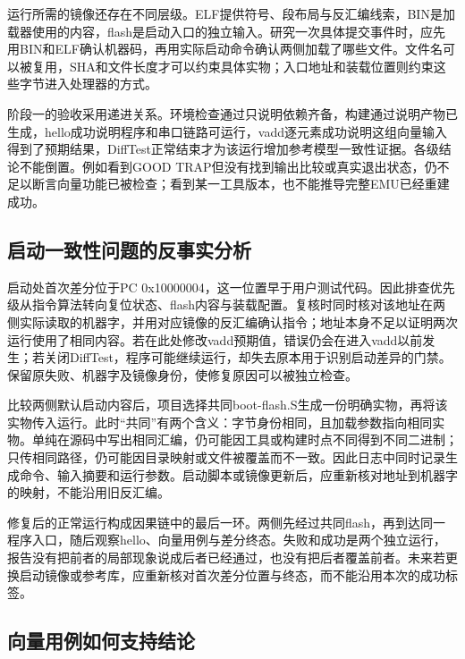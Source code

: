 运行所需的镜像还存在不同层级。ELF提供符号、段布局与反汇编线索，BIN是加载器使用的内容，flash是启动入口的独立输入。研究一次具体提交事件时，应先用BIN和ELF确认机器码，再用实际启动命令确认两侧加载了哪些文件。文件名可以被复用，SHA和文件长度才可以约束具体实物；入口地址和装载位置则约束这些字节进入处理器的方式。\par


阶段一的验收采用递进关系。环境检查通过只说明依赖齐备，构建通过说明产物已生成，hello成功说明程序和串口链路可运行，vadd逐元素成功说明这组向量输入得到了预期结果，DiffTest正常结束才为该运行增加参考模型一致性证据。各级结论不能倒置。例如看到GOOD TRAP但没有找到输出比较或真实退出状态，仍不足以断言向量功能已被检查；看到某一工具版本，也不能推导完整EMU已经重建成功。\par


\subsection{启动一致性问题的反事实分析}


启动处首次差分位于PC 0x10000004，这一位置早于用户测试代码。因此排查优先级从指令算法转向复位状态、flash内容与装载配置。复核时同时核对该地址在两侧实际读取的机器字，并用对应镜像的反汇编确认指令；地址本身不足以证明两次运行使用了相同内容。若在此处修改vadd预期值，错误仍会在进入vadd以前发生；若关闭DiffTest，程序可能继续运行，却失去原本用于识别启动差异的门禁。保留原失败、机器字及镜像身份，使修复原因可以被独立检查。\par


比较两侧默认启动内容后，项目选择共同boot-flash.S生成一份明确实物，再将该实物传入运行。此时“共同”有两个含义：字节身份相同，且加载参数指向相同实物。单纯在源码中写出相同汇编，仍可能因工具或构建时点不同得到不同二进制；只传相同路径，仍可能因目录映射或文件被覆盖而不一致。因此日志中同时记录生成命令、输入摘要和运行参数。启动脚本或镜像更新后，应重新核对地址到机器字的映射，不能沿用旧反汇编。\par


修复后的正常运行构成因果链中的最后一环。两侧先经过共同flash，再到达同一程序入口，随后观察hello、向量用例与差分终态。失败和成功是两个独立运行，报告没有把前者的局部现象说成后者已经通过，也没有把后者覆盖前者。未来若更换启动镜像或参考库，应重新核对首次差分位置与终态，而不能沿用本次的成功标签。\par


\subsection{向量用例如何支持结论}


